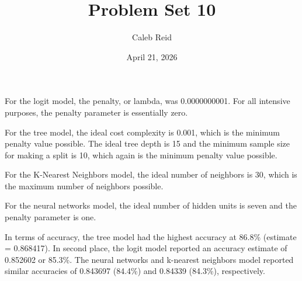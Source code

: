 \documentclass{article}
\title{Problem Set 10}
\date{April 21, 2026}
\author{Caleb Reid}
\begin{document}
\maketitle

For the logit model, the penalty, or lambda, was 0.0000000001. For all intensive purposes, the penalty parameter is essentially zero.

For the tree model, the ideal cost complexity is 0.001, which is the minimum penalty value possible. The ideal tree depth is 15 and the minimum sample size for making a split is 10, which again is the minimum penalty value possible.

For the K-Nearest Neighbors model, the ideal number of neighbors is 30, which is the maximum number of neighbors possible.

For the neural networks model, the ideal number of hidden units is seven and the penalty parameter is one.

In terms of accuracy, the tree model had the highest accuracy at 86.8\% (estimate = 0.868417). In second place, the logit model reported an accuracy estimate of 0.852602 or 85.3\%. The neural networks and k-nearest neighbors model reported similar accuracies of 0.843697 (84.4\%) and 0.84339 (84.3\%), respectively.  
\end{document}
